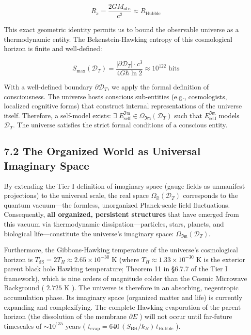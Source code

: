 \documentclass[11pt,a4paper]{article}
\theoremstyle{definition}
\theoremstyle{remark}
\begin{document}
\begin{equation}
R_s = \frac{2GM_{\text{obs}}}{c^2} \approx R_{\text{Hubble}}
\end{equation}


This exact geometric identity permits us to bound the observable universe as a thermodynamic entity. The Bekenstein-Hawking entropy of this cosmological horizon is finite and well-defined:


\begin{equation}
S_{\text{max}}(\mathcal{D}_T) = \frac{|\partial \mathcal{D}_T| \cdot c^3}{4G\hbar\ln 2} \approx 10^{122} \text{ bits}
\end{equation}


With a well-defined boundary $\partial \mathcal{D}_T$, we apply the formal definition of consciousness. The universe hosts conscious sub-entities (e.g., cosmologists, localized cognitive forms) that construct internal representations of the universe itself. Therefore, a self-model exists: $\exists\; E_{\text{self}}^{\mathfrak{Im}} \in \Omega_{\mathfrak{Im}}(\mathcal{D}_T)$ such that $E_{\text{self}}^{\mathfrak{Im}}$ models $\mathcal{D}_T$. The universe satisfies the strict formal conditions of a conscious entity.

\subsection{7.2 The Organized World as Universal Imaginary Space}
By extending the Tier I definition of imaginary space (gauge fields as unmanifest projections) to the universal scale, the real space $\Omega_{\mathbb{R}}(\mathcal{D}_T)$ corresponds to the quantum vacuum—the formless, unorganized Planck-scale field fluctuations. Consequently, \textbf{all organized, persistent structures} that have emerged from this vacuum via thermodynamic dissipation—particles, stars, planets, and biological life—constitute the universe's imaginary space: $\Omega_{\mathfrak{Im}}(\mathcal{D}_T)$.

Furthermore, the Gibbons-Hawking temperature of the universe's cosmological horizon is $T_{\text{dS}} = 2 T_H \approx 2.65 \times 10^{-30} \text{ K}$ (where $T_H \approx 1.33 \times 10^{-30} \text{ K}$ is the exterior parent black hole Hawking temperature; Theorem 11 in \S 6.7.7 of the Tier I framework), which is nine orders of magnitude colder than the Cosmic Microwave Background ( $2.725 \text{ K}$ ). The universe is therefore in an absorbing, negentropic accumulation phase. Its imaginary space (organized matter and life) is currently expanding and complexifying. The complete Hawking evaporation of the parent horizon (the dissolution of the membrane $\partial E$ ) will not occur until far-future timescales of $\sim 10^{135}$ years ( $t_{\text{evap}} = 640 \, (S_{\text{BH}}/k_B) \, t_{\text{Hubble}}$ ).
\end{document}
